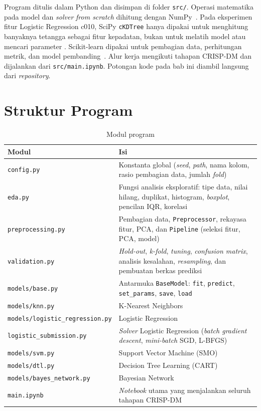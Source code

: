 Program ditulis dalam Python dan disimpan di folder \texttt{src/}. Operasi
matematika pada model dan \textit{solver} \textit{from scratch} dihitung dengan
NumPy~\cite{numpy2026docs}. Pada eksperimen fitur Logistic Regression c010,
SciPy \texttt{cKDTree} hanya dipakai untuk menghitung banyaknya tetangga sebagai
fitur kepadatan, bukan untuk melatih model atau mencari parameter
\cite{scipy2026ckdtree}. Scikit-learn dipakai untuk pembagian data, perhitungan
metrik, dan model pembanding~\cite{sklearn2026docs}. Alur kerja mengikuti
tahapan CRISP-DM dan dijalankan dari \texttt{src/main.ipynb}.
Potongan kode pada bab ini diambil langsung dari \textit{repository}.

\section{Struktur Program}

\begin{table}[H]
	\centering
	\caption{Modul program}
	\label{tab:modul}
	\begin{tabular}{l p{7cm}}
		\toprule
		\textbf{Modul} & \textbf{Isi} \\
		\midrule
		\texttt{config.py} & Konstanta global (\textit{seed}, \textit{path}, nama kolom, rasio pembagian data, jumlah \textit{fold}) \\
		\texttt{eda.py} & Fungsi analisis eksploratif: tipe data, nilai hilang, duplikat, histogram, \textit{boxplot}, pencilan IQR, korelasi \\
		\texttt{preprocessing.py} & Pembagian data, \texttt{Preprocessor}, rekayasa fitur, PCA, dan \texttt{Pipeline} (seleksi fitur, PCA, model) \\
		\texttt{validation.py} & \textit{Hold-out}, \textit{k-fold}, \textit{tuning}, \textit{confusion matrix}, analisis kesalahan, \textit{resampling}, dan pembuatan berkas prediksi \\
		\texttt{models/base.py} & Antarmuka \texttt{BaseModel}: \texttt{fit}, \texttt{predict}, \texttt{set\_params}, \texttt{save}, \texttt{load} \\
		\texttt{models/knn.py} & K-Nearest Neighbors \\
		\texttt{models/logistic\_regression.py} & Logistic Regression \\
		\texttt{logistic\_submission.py} & \textit{Solver} Logistic Regression (\textit{batch gradient descent}, \textit{mini-batch} SGD, L-BFGS) \\
		\texttt{models/svm.py} & Support Vector Machine (SMO) \\
		\texttt{models/dtl.py} & Decision Tree Learning (CART) \\
		\texttt{models/bayes\_network.py} & Bayesian Network \\
		\texttt{main.ipynb} & \textit{Notebook} utama yang menjalankan seluruh tahapan CRISP-DM \\
		\bottomrule
	\end{tabular}
\end{table}

